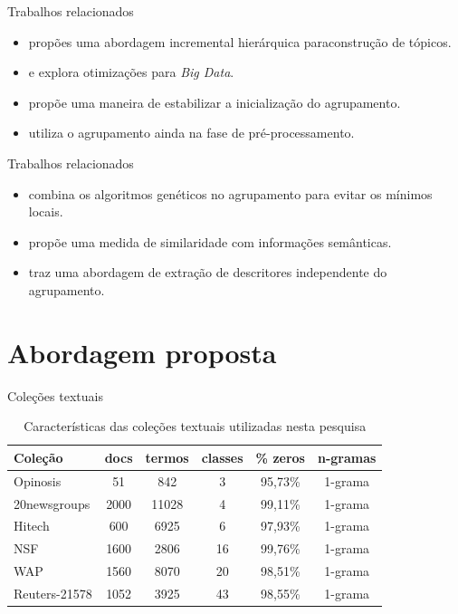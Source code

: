 \documentclass[brazil]{beamer}
\begin{document}
\begin{frame}{Trabalhos relacionados}
  \begin{itemize}
  \item<1 ->  propões uma abordagem incremental hierárquica paraconstrução
    de tópicos.
  \item<2 ->  e  explora otimizações para {\it Big
    Data\/}.
  \item<3 ->  propõe uma maneira de estabilizar a inicialização do agrupamento.
  \item<4 ->  utiliza o agrupamento ainda na fase de pré-processamento.
  \end{itemize}
\end{frame}
\begin{frame}{Trabalhos relacionados}
  \begin{itemize}
  \item<1 ->  combina os algoritmos genéticos no agrupamento para evitar os
    mínimos locais.
  \item<2 ->  propõe uma medida de similaridade com informações semânticas. 
  \item<3 ->  traz uma abordagem de extração de descritores independente do
    agrupamento.
  \end{itemize}
\end{frame}

\section{Abordagem proposta}

\begin{frame}{Coleções textuais}
  \begin{table}[!htp]
    \centering
    \begin{tabular}{ |l|c c c c c|}
      \hline
      {\bf Coleção} & {\bf docs} & {\bf termos} & {\bf classes} & {\bf \% zeros} & {\bf n-gramas} \\
      \hline
      Opinosis & 51 & 842 & 3 & 95,73\% & 1-grama \\
      \hline
      20newsgroups & 2000 & 11028 & 4 & 99,11\% & 1-grama \\
      \hline
      Hitech & 600 & 6925 & 6 & 97,93\% & 1-grama \\
      \hline
      NSF & 1600 & 2806 & 16 & 99,76\% & 1-grama \\
      \hline
      WAP & 1560 & 8070 & 20 & 98,51\% & 1-grama \\
      \hline
      Reuters-21578 & 1052 & 3925 & 43 & 98,55\% & 1-grama \\
      \hline
    \end{tabular}
    \caption{Características das coleções textuais utilizadas nesta pesquisa}
    \label{table:datasets}
  \end{table}
\end{frame}
\end{document}
